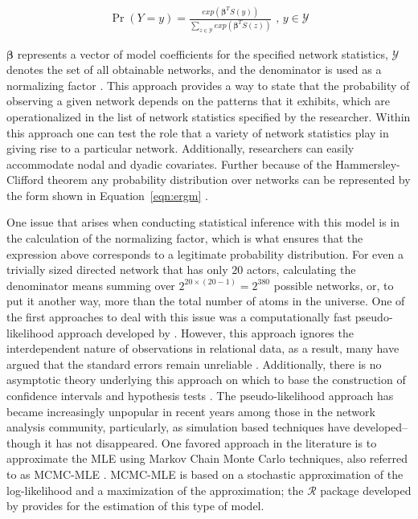 \begin{align}
\Pr(Y = y) = \frac{ exp( \bm\beta^{T} S(y)  )  }{ \sum_{z \in \mathcal{Y}} exp( \bm\beta^{T} S(z)  )  } \text{ ,  } y \in \mathcal{Y}
\label{eqn:ergm}
\end{align}

$\bm\beta$ represents a vector of model coefficients for the specified network statistics, $\mathcal{Y}$ denotes the set of all obtainable networks, and the denominator is used as a normalizing factor \citep{hunter:etal:2008}. This approach provides a way to state that the probability of observing a given network depends on the patterns that it exhibits, which are operationalized in the list of network statistics specified by the researcher. Within this approach one can test the role that a variety of network statistics play in giving rise to a particular network. Additionally, researchers can easily accommodate nodal and dyadic covariates. Further because of the Hammersley-Clifford theorem any probability distribution over networks can be represented by the form shown in Equation~\ref{eqn:ergm} \citep{hammersley:clifford:1971}. 

One issue that arises when conducting statistical inference with this model is in the calculation of the normalizing factor, which is what ensures that the expression above corresponds to a legitimate probability distribution. For even a trivially sized directed network that has only $20$ actors, calculating the denominator means summing over $2^{20\times(20-1)} = 2^{380}$ possible networks, or, to put it another way, more than the total number of atoms in the universe. One of the first approaches to deal with this issue was a computationally fast pseudo-likelihood approach developed by \citet{strauss:iked:1990}. However, this approach ignores the interdependent nature of observations in relational data, as a result, many have argued that the standard errors remain unreliable \citep{lubbers:snijders:2007,robins:etal:2007a,vanduijn:etal:2009}. Additionally, there is no asymptotic theory underlying this approach on which to base the construction of confidence intervals and hypothesis tests \citep{kolaczyk:2009}. The pseudo-likelihood approach has became increasingly unpopular in recent years among those in the network analysis community, particularly, as simulation based techniques have developed--though it has not disappeared. One favored approach in the literature is to approximate the MLE using Markov Chain Monte Carlo techniques, also referred to as MCMC-MLE \citep{geyer:thompson:1992,snijders:2002,handcock:2003b}. MCMC-MLE is based on a stochastic approximation of the log-likelihood and a maximization of the approximation; the  $\mathcal{R}$ package developed by \citet{hunter:etal:2008} provides for the estimation of this type of model.

